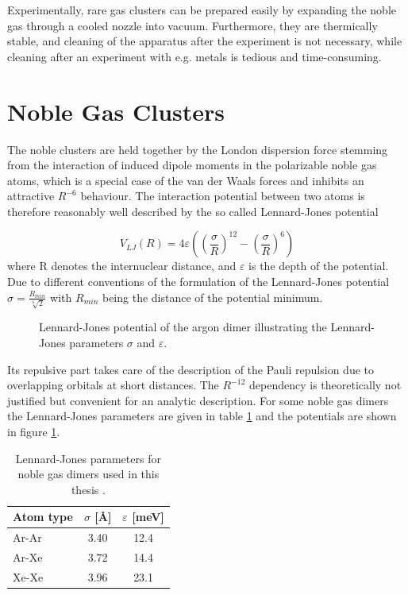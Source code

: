 Experimentally, rare gas clusters can be prepared easily by
expanding the noble gas through a cooled nozzle into vacuum. 
Furthermore, they are
thermically stable, and cleaning of the
apparatus after the experiment is not necessary, while cleaning
after an experiment with e.g. metals is tedious and time-consuming.


\section{Noble Gas Clusters}
The noble clusters are held together by the London dispersion force
stemming from the interaction of induced dipole moments in the polarizable
noble gas atoms, which is a special case of the van der Waals forces and
inhibits an attractive $R^{-6}$ behaviour.
The interaction potential between two atoms is therefore reasonably
well described by the so called
Lennard-Jones potential

\begin{equation}
  V_{LJ}(R) = 4 \varepsilon \left( \left(\frac{\sigma}{R}\right) ^{12}
              - \left(\frac{\sigma}{R}\right) ^{6} \right)
\end{equation}
where R denotes the internuclear distance, 
and $\varepsilon$ is the depth of the
potential. Due to different conventions of the formulation
of the Lennard-Jones potential $\sigma=\frac{R_{min}}{\sqrt[6]{2}}$
with $R_{min}$ being the distance of the potential minimum.

\begin{figure}[h]
 \centering
 
 \caption{Lennard-Jones potential of the argon dimer illustrating the
          Lennard-Jones parameters $\sigma$ and $\varepsilon$.}
 \label{figure:LJ_Ar2}
\end{figure}

Its repulsive part takes care of the description of the
Pauli repulsion due to overlapping orbitals at short distances. The
$R^{-12}$ dependency is theoretically not justified but convenient
for an analytic description.
For some noble gas dimers the Lennard-Jones parameters are given in
table \ref{table:LJ_parameter} and the potentials are shown in
figure \ref{figure:LJ_Ar2}.

\begin{table}[htb]
 \caption{Lennard-Jones parameters for noble gas dimers used in this
          thesis \cite{PhDFoerstel,Lindblad11}.}
 \centering
 \begin{tabular}{lcc}
   \toprule
   Atom type & $\sigma$ [\unit{\AA}] & $\varepsilon$ [\unit{meV}]\\
   \midrule
   Ar-Ar     &                 3.40  & 12.4\\
   Ar-Xe     &                 3.72  & 14.4\\
   Xe-Xe     &                 3.96  & 23.1\\
   \bottomrule
 \end{tabular}
 \label{table:LJ_parameter}
\end{table}


